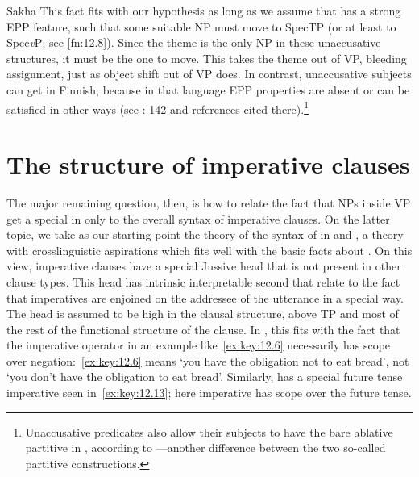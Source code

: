 \documentclass[output=paper]{langsci/langscibook}
\begin{document}
\ea\label{ex:key:12.12}Sakha
	\z
\z
This fact fits with our hypothesis as long as we assume that  has a
strong \gls{EPP} feature, such that some suitable NP must move to
SpecTP (or at least to Spec\emph{v}\textsubscript{\Imp}P; see \cref{fn:12.8}).
Since the theme is the only NP in these unaccusative structures, it must be the
one to move. This takes the theme out of VP, bleeding 
assignment, just as object shift out of VP does.  In contrast, unaccusative
subjects can get  in Finnish, because in that language EPP
properties are absent or can be satisfied in other ways (see
\citealt{Baker2015}: 142 and references cited there).\footnote{Unaccusative
    predicates also allow their subjects to have the bare ablative partitive in
    , according to \textcite{Kornfilt1990,Kornfilt1996}—another
difference between the two so-called partitive constructions.}

\section{The structure of imperative clauses}

The major remaining question, then, is how to relate the fact that NPs inside
VP get a special  in  only to the overall syntax of
imperative clauses. On the latter topic, we take as our starting point the
theory of the syntax of  in \citet{Zanuttini2008} and
\citet{ZanPakPor2012}, a theory with crosslinguistic aspirations which fits
well with the basic facts about . On this view, imperative clauses have a
special Jussive head that is not present in other clause types. This head has
intrinsic interpretable second  that relate to the fact that
imperatives are enjoined on the addressee of the utterance in a special way.
The head is assumed to be high in the clausal structure, above TP and most of
the rest of the functional structure of the clause. In , this fits with
the fact that the imperative operator in an example like~\eqref{ex:key:12.6} necessarily has
scope over negation:~\eqref{ex:key:12.6} means ‘you have the obligation not to eat bread’, not
‘you don’t have the obligation to eat bread’. Similarly,  has a special
future tense imperative seen in~\eqref{ex:key:12.13}; here imperative has scope over the future
tense.
\end{document}
